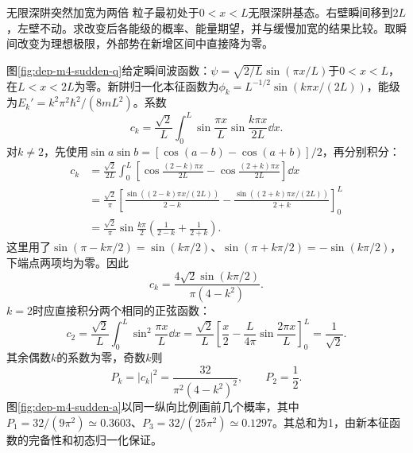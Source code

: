 \begin{example}无限深阱突然加宽为两倍
粒子最初处于$0<x<L$无限深阱基态。右壁瞬间移到$2L$，左壁不动。求改变后各能级的概率、能量期望，并与缓慢加宽的结果比较。取瞬间改变为理想极限，外部势在新增区间中直接降为零。
\end{example}
\begin{solution}
图\ref{fig:dep-m4-sudden-q}给定瞬间波函数：$\psi=\sqrt{2/L}\sin(\pi x/L)$于$0<x<L$，在$L<x<2L$为零。新阱归一化本征函数为$\phi_k=L^{-1/2}\sin(k\pi x/(2L))$，能级为$E_k'=k^2\pi^2\hbar^2/(8mL^2)$。系数
\[
 c_k=\frac{\sqrt2}{L}\int_0^L\sin\frac{\pi x}{L}
 \sin\frac{k\pi x}{2L}\dd x.
\]
对$k\ne2$，先使用$\sin a\sin b=[\cos(a-b)-\cos(a+b)]/2$，再分别积分：
\begin{align*}
 c_k&=\frac{\sqrt2}{2L}\int_0^L
 \left[\cos\frac{(2-k)\pi x}{2L}-\cos\frac{(2+k)\pi x}{2L}\right]\dd x\\
 &=\frac{\sqrt2}{\pi}
 \left[\frac{\sin((2-k)\pi x/(2L))}{2-k}
 -\frac{\sin((2+k)\pi x/(2L))}{2+k}\right]_0^L\\
 &=\frac{\sqrt2}{\pi}\sin\frac{k\pi}{2}
 \left(\frac1{2-k}+\frac1{2+k}\right).
\end{align*}
这里用了$\sin(\pi-k\pi/2)=\sin(k\pi/2)$、$\sin(\pi+k\pi/2)=-\sin(k\pi/2)$，下端点两项均为零。因此
\[
 c_k=\frac{4\sqrt2\sin(k\pi/2)}{\pi(4-k^2)}.
\]
$k=2$时应直接积分两个相同的正弦函数：
\[
 c_2=\frac{\sqrt2}{L}\int_0^L\sin^2\frac{\pi x}{L}\dd x
 =\frac{\sqrt2}{L}\left[\frac x2-\frac{L}{4\pi}\sin\frac{2\pi x}{L}\right]_0^L
 =\frac1{\sqrt2}.
\]
其余偶数$k$的系数为零，奇数$k$则
\[
 P_k=|c_k|^2=\frac{32}{\pi^2(4-k^2)^2},
 \qquad P_2=\frac12.
\]
图\ref{fig:dep-m4-sudden-a}以同一纵向比例画前几个概率，其中$P_1=32/(9\pi^2)\simeq0.3603$、$P_3=32/(25\pi^2)\simeq0.1297$。其总和为1，由新本征函数的完备性和初态归一化保证。


\end{solution}
